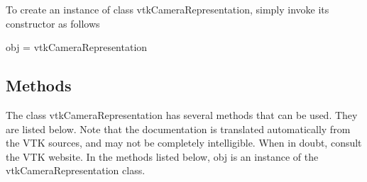 To create an instance of class vtk\-Camera\-Representation, simply invoke its constructor as follows \begin{DoxyVerb}  obj = vtkCameraRepresentation
\end{DoxyVerb}
 \hypertarget{vtkwidgets_vtkxyplotwidget_Methods}{}\subsection{Methods}\label{vtkwidgets_vtkxyplotwidget_Methods}
The class vtk\-Camera\-Representation has several methods that can be used. They are listed below. Note that the documentation is translated automatically from the V\-T\-K sources, and may not be completely intelligible. When in doubt, consult the V\-T\-K website. In the methods listed below, {\ttfamily obj} is an instance of the vtk\-Camera\-Representation class. 
